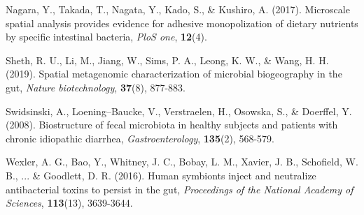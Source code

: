 \documentclass{bioinfo}
\begin{document}
\begin{thebibliography}{}
Nagara, Y., Takada, T., Nagata, Y., Kado, S., \& Kushiro, A. (2017). Microscale spatial analysis provides evidence for adhesive monopolization of dietary nutrients by specific intestinal bacteria, {\it PloS one}, {\bf 12}(4).

Sheth, R. U., Li, M., Jiang, W., Sims, P. A., Leong, K. W., \& Wang, H. H. (2019). Spatial metagenomic characterization of microbial biogeography in the gut, {\it Nature biotechnology}, {\bf 37}(8), 877-883.

Swidsinski, A., Loening–Baucke, V., Verstraelen, H., Osowska, S., \& Doerffel, Y. (2008). Biostructure of fecal microbiota in healthy subjects and patients with chronic idiopathic diarrhea, {\it Gastroenterology}, {\bf 135}(2), 568-579.

Wexler, A. G., Bao, Y., Whitney, J. C., Bobay, L. M., Xavier, J. B., Schofield, W. B., ... \& Goodlett, D. R. (2016). Human symbionts inject and neutralize antibacterial toxins to persist in the gut, {\it Proceedings of the National Academy of Sciences}, {\bf 113}(13), 3639-3644.


\end{thebibliography}
\end{document}
